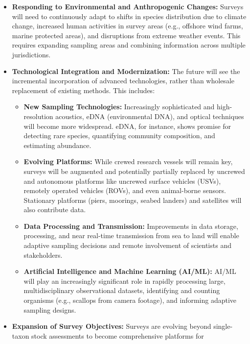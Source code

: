 \documentclass[
  letterpaper,
  oneside,
  open=any]{scrbook}
\providecommand{\tightlist}{%
  \setlength{\itemsep}{0pt}\setlength{\parskip}{0pt}}\usepackage{longtable,booktabs,array}
\begin{document}
\begin{itemize}
\tightlist
\item
  \textbf{Responding to Environmental and Anthropogenic Changes:}
  Surveys will need to continuously adapt to shifts in species
  distribution due to climate change, increased human activities in
  survey areas (e.g., offshore wind farms, marine protected areas), and
  disruptions from extreme weather events. This requires expanding
  sampling areas and combining information across multiple
  jurisdictions.
\item
  \textbf{Technological Integration and Modernization:} The future will
  see the incremental incorporation of advanced technologies, rather
  than wholesale replacement of existing methods. This includes:

  \begin{itemize}
  \tightlist
  \item
    \textbf{New Sampling Technologies:} Increasingly sophisticated and
    high-resolution acoustics, eDNA (environmental DNA), and optical
    techniques will become more widespread. eDNA, for instance, shows
    promise for detecting rare species, quantifying community
    composition, and estimating abundance.
  \item
    \textbf{Evolving Platforms:} While crewed research vessels will
    remain key, surveys will be augmented and potentially partially
    replaced by uncrewed and autonomous platforms like uncrewed surface
    vehicles (USVs), remotely operated vehicles (ROVs), and even
    animal-borne sensors. Stationary platforms (piers, moorings, seabed
    landers) and satellites will also contribute data.
  \item
    \textbf{Data Processing and Transmission:} Improvements in data
    storage, processing, and near real-time transmission from sea to
    land will enable adaptive sampling decisions and remote involvement
    of scientists and stakeholders.
  \item
    \textbf{Artificial Intelligence and Machine Learning (AI/ML):} AI/ML
    will play an increasingly significant role in rapidly processing
    large, multidisciplinary observational datasets, identifying and
    counting organisms (e.g., scallops from camera footage), and
    informing adaptive sampling designs.
  \end{itemize}
\item
  \textbf{Expansion of Survey Objectives:} Surveys are evolving beyond
  single-taxon stock assessments to become comprehensive platforms for

\end{itemize}
\end{document}
